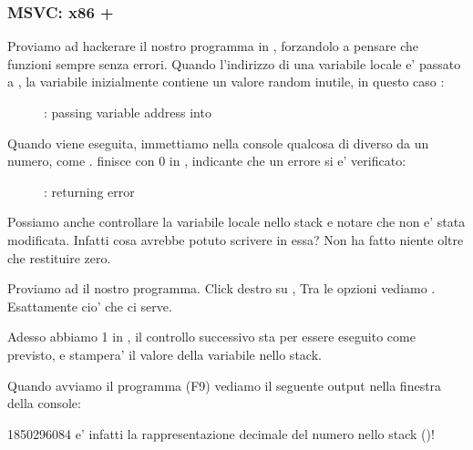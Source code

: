 \clearpage
\subsubsection{MSVC: x86 + \olly}

Proviamo ad hackerare il nostro programma in \olly, forzandolo a pensare che \scanf funzioni sempre senza errori.
Quando l'indirizzo di una variabile locale e' passato a \scanf, la variabile inizialmente contiene un valore random inutile, in questo caso :

\begin{figure}[H]
\centering
{}
\caption{\olly: passing variable address into \scanf}
\label{fig:scanf_ex3_olly_1}
\end{figure}

\clearpage
Quando \scanf viene eseguita, immettiamo nella console qualcosa di diverso da un numero, come .
\scanf finisce con 0 in \EAX, indicante che un errore si e' verificato:

\begin{figure}[H]
\centering
{}
\caption{\olly: \scanf returning error}
\label{fig:scanf_ex3_olly_2}
\end{figure}

Possiamo anche controllare la variabile locale nello stack e notare che non e' stata modificata.
Infatti cosa avrebbe potuto scrivere \scanf in essa? Non ha fatto niente oltre che restituire zero. 


Proviamo ad  il nostro programma.
Click destro su \EAX, 
Tra le opzioni vediamo .
Esattamente cio' che ci serve.

Adesso abbiamo 1 in \EAX, il controllo successivo sta per essere eseguito come previsto,
e \printf stampera' il valore della variabile nello stack.

Quando avviamo il programma (F9) vediamo il seguente output nella finestra della console:



1850296084 e' infatti la rappresentazione decimale del numero nello stack ()!
